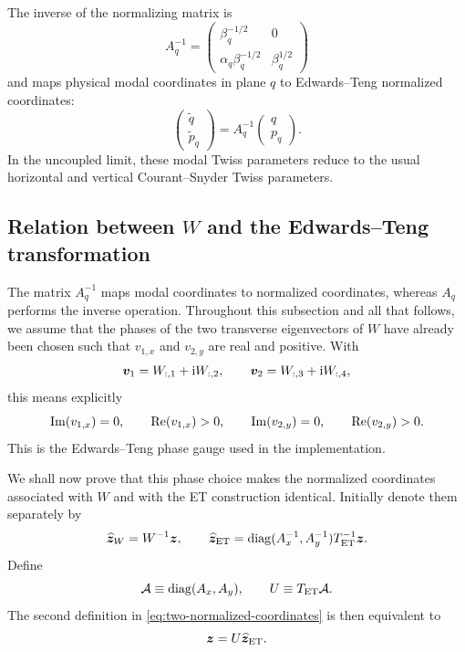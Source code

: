 The inverse of the normalizing matrix is
\begin{equation}
 A_q^{-1}=
 \begin{pmatrix}
  \beta_q^{-1/2}&0\\
  \alpha_q\beta_q^{-1/2}&\beta_q^{1/2}
 \end{pmatrix}
 \label{eq:Aq-inverse}
\end{equation}
and maps physical modal coordinates in plane $q$ to Edwards--Teng normalized
coordinates:
\begin{equation}
 \begin{pmatrix}\widetilde q\\\widetilde p_q\end{pmatrix}
 =A_q^{-1}\begin{pmatrix}q\\p_q\end{pmatrix}.
 \label{eq:cs-normalization}
\end{equation}
In the uncoupled limit, these modal Twiss parameters reduce to the usual
horizontal and vertical Courant--Snyder Twiss parameters.

\subsection{Relation between $W$ and the Edwards--Teng transformation}

The matrix $A_q^{-1}$ maps modal coordinates to normalized coordinates,
whereas $A_q$ performs the inverse operation.  Throughout this subsection and
all that follows, we assume that the phases of the two transverse eigenvectors
of $W$ have already been chosen such that $v_{1,x}$ and $v_{2,y}$ are real and
positive.  With
\begin{equation}
 \bm{v}_1=W_{:,1}+\mathrm{i} W_{:,2},
 \qquad
 \bm{v}_2=W_{:,3}+\mathrm{i} W_{:,4},
\end{equation}
this means explicitly
\begin{equation}
 \operatorname{Im}(v_{1,x})=0,
 \qquad
 \operatorname{Re}(v_{1,x})>0,
 \qquad
 \operatorname{Im}(v_{2,y})=0,
 \qquad
 \operatorname{Re}(v_{2,y})>0.
 \label{eq:et-rephasing-of-w}
\end{equation}
This is the Edwards--Teng phase gauge used in the implementation.

We shall now prove that this phase choice makes the normalized coordinates
associated with $W$ and with the ET construction identical.  Initially denote
them separately by
\begin{equation}
 \widehat{\bm{z}}_W=W^{-1}\bm{z},
 \qquad
 \widehat{\bm{z}}_{\mathrm{ET}}
 =\operatorname{diag}(A_x^{-1},A_y^{-1})T_{\mathrm{ET}}^{-1}\bm{z}.
 \label{eq:two-normalized-coordinates}
\end{equation}
Define
\begin{equation}
 \mathcal A\equiv\operatorname{diag}(A_x,A_y),
 \qquad
 U\equiv T_{\mathrm{ET}}\mathcal A.
 \label{eq:U-definition}
\end{equation}
The second definition in \cref{eq:two-normalized-coordinates} is then
equivalent to
\begin{equation}
 \bm{z}=U\widehat{\bm{z}}_{\mathrm{ET}}.
 \label{eq:z-from-et-normalized}
\end{equation}

